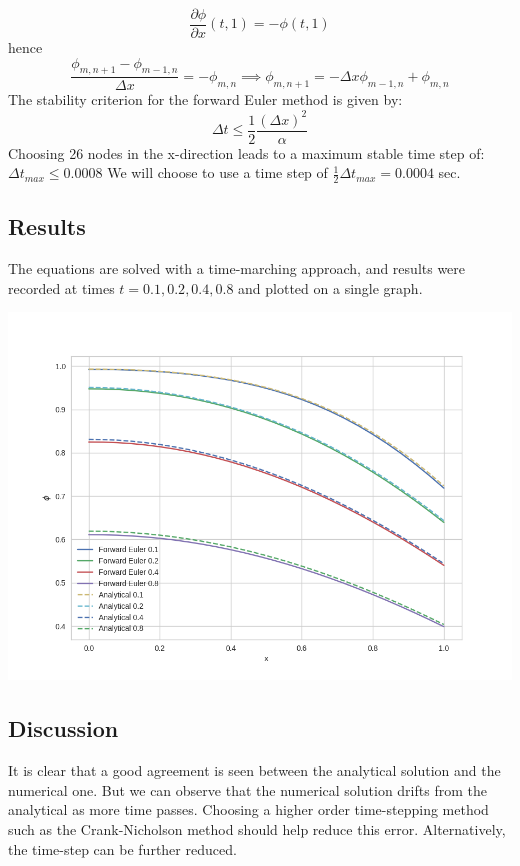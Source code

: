 \documentclass[11pt]{article}
\begin{document}
\[
\frac{ \partial \phi }{\partial x} ( t,1) = - \phi (t,1)
\]
hence 
\[
\frac{\phi_{m,n+1}-\phi_{m-1,n}}{\Delta x} = - \phi_{m,n} \implies \phi_{m,n+1} = -\Delta x \phi_{m-1,n} + \phi_{m,n} 
\]
The stability criterion for the forward Euler method is given by:
\[
\Delta t \leq \frac{1}{2} \frac{(\Delta x)^{2}}{\alpha}
\]
Choosing 26 nodes in the x-direction leads to a maximum stable time step of: $\Delta t_{max} \leq 0.0008$
We will choose to use a time step of $\frac{1}{2} \Delta t_{max} = 0.0004$ sec. 

\subsection{Results}
\label{sec-1-3}
The equations are solved with a time-marching approach, and results were recorded at times $t = 0.1, 0.2, 0.4, 0.8$ and plotted on a single graph.

\includegraphics[width=14cm]{./figures/phi.png}

\subsection{Discussion}
\label{sec-1-4}
It is clear that a good agreement is seen between the analytical solution and the numerical one. But we can observe that the numerical solution drifts from the analytical as more time passes.  
Choosing a higher order time-stepping method such as the Crank-Nicholson method should help reduce this error. Alternatively, the time-step can be further reduced.

\newpage
\end{document}
